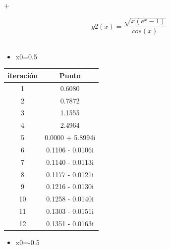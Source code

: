 +\documentclass{udpreport}
\begin{document}
\begin{enumerate}
\begin{enumerate}
\begin{equation}
 g2(x) = \frac{\sqrt{x(e^x-1)}}
{cos(x)}
\end{equation}
\\
\begin{itemize}
\item x0=0.5
\end{itemize}

\begin{table}[H]
    \centering
        \begin{tabular} { |c|c|}
        
        \hline
        iteración  &  Punto\\
        \hline
        1 &  0.6080       \\
         \hline
        2 &   0.7872     \\
         \hline
        3 &  1.1555       \\
         \hline
        4 &   2.4964     \\
         \hline
        5 & 0.0000 + 5.8994i        \\
         \hline
        6 &  0.1106 - 0.0106i       \\
         \hline
        7 & 0.1140 - 0.0113i         \\
         \hline
        8 &    0.1177 - 0.0121i     \\
         \hline
        9 &     0.1216 - 0.0130i     \\
         \hline
        10 &   0.1258 - 0.0140i       \\
         \hline
        11 &    0.1303 - 0.0151i   \\
         \hline
        12 &  0.1351 - 0.0163i        \\
        \hline
        
        \end{tabular}
        
    \end{table}
    \begin{itemize}
\item x0=-0.5
\end{itemize}

\begin{table}[H]
    \centering
        \begin{tabular} { |c|c|}
        

\end{tabular}
\end{table}
\end{enumerate}
\end{enumerate}
\end{document}
